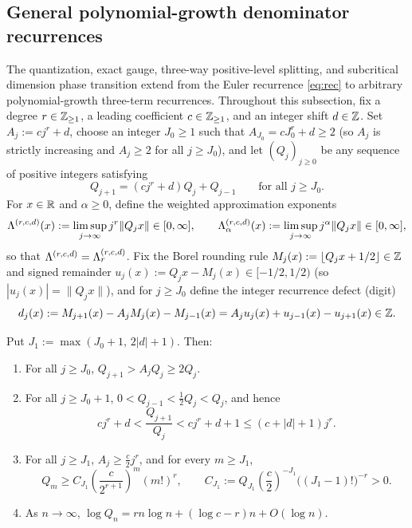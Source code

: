 \subsection{General polynomial-growth denominator recurrences}\label{sec:poly-rec}

The quantization, exact gauge, three-way positive-level splitting, and
subcritical dimension phase transition extend from the Euler recurrence
\eqref{eq:rec} to arbitrary polynomial-growth three-term recurrences. Throughout
this subsection, fix a degree $r\in\mathbb{Z}_{\ge1}$, a leading coefficient
$c\in\mathbb{Z}_{\ge1}$, and an integer shift $d\in\mathbb{Z}$. Set $A_j:=cj^r+d$, choose an
integer $J_0\ge1$ such that $A_{J_0}=cJ_0^r+d\ge2$ (so $A_j$ is strictly
increasing and $A_j\ge2$ for all $j\ge J_0$), and let $(Q_j)_{j\ge0}$ be any
sequence of positive integers satisfying
\begin{equation}\label{eq:poly-rec}
Q_{j+1}=(cj^r+d)Q_j+Q_{j-1}\qquad\text{for all }j\ge J_0.
\end{equation}
For $x\in\mathbb{R}$ and $\alpha\ge0$, define the weighted approximation exponents
\[
\Lambda^{(r,c,d)}(x):=\limsup_{j\to\infty}j^r\|Q_jx\|\in[0,\infty],\qquad
\Lambda_\alpha^{(r,c,d)}(x):=\limsup_{j\to\infty}j^\alpha\|Q_jx\|\in[0,\infty],
\]
so that $\Lambda^{(r,c,d)}=\Lambda_r^{(r,c,d)}$. Fix the Borel rounding rule
$M_j(x):=\lfloor Q_jx+1/2\rfloor\in\mathbb{Z}$ and signed remainder
$u_j(x):=Q_jx-M_j(x)\in[-1/2,1/2)$ (so $|u_j(x)|=\|Q_jx\|$), and for $j\ge J_0$
define the integer recurrence defect (digit)
\begin{equation}\label{eq:poly-defect-id}
d_j(x):=M_{j+1}(x)-A_jM_j(x)-M_{j-1}(x)=A_ju_j(x)+u_{j-1}(x)-u_{j+1}(x)\in\mathbb{Z}.
\end{equation}

\begin{lemma}\label{lem:poly-growth}
Put $J_1:=\max(J_0+1,\,2|d|+1)$. Then:
\begin{enumerate}[label=(\roman*),leftmargin=2em]
\item For all $j\ge J_0$, $Q_{j+1}>A_jQ_j\ge2Q_j$.
\item For all $j\ge J_0+1$, $0<Q_{j-1}<\frac12Q_j<Q_j$, and hence
\[
cj^r+d<\frac{Q_{j+1}}{Q_j}<cj^r+d+1\le(c+|d|+1)j^r.
\]
\item For all $j\ge J_1$, $A_j\ge\frac{c}{2}j^r$, and for every $m\ge J_1$,
\[
Q_m\ge C_{J_1}\left(\frac{c}{2^{r+1}}\right)^m(m!)^r,\qquad
C_{J_1}:=Q_{J_1}\left(\frac{c}{2}\right)^{-J_1}\bigl((J_1-1)!\bigr)^{-r}>0.
\]
\item As $n\to\infty$, $\log Q_n=rn\log n+(\log c-r)n+O(\log n)$.
\end{enumerate}
\end{lemma}

